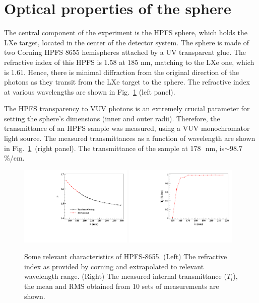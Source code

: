 \section{Optical properties of the sphere }
\label{sec:opt}


The central component of the experiment is the HPFS sphere, which holds the LXe target, located in the center of the detector system. The sphere is made of two Corning HPFS 8655 hemispheres attached by a UV transparent glue. The refractive index of this HPFS is 1.58 at 185 nm, matching to the LXe one, which is 1.61. Hence, there is minimal diffraction from the original direction of the photons as they transit from the LXe target to the sphere. The refractive index at various wavelengths are shown in Fig.~\ref{fig:hpfsRIcalibration} (left panel).


The HPFS transparency to VUV photons is an extremely crucial parameter for setting the sphere's dimensions (inner and outer radii). 
Therefore, the transmittance of an HPFS sample was measured, using a VUV monochromator light source. The measured transmittances as a function of wavelength are shown in Fig.~\ref{fig:hpfsRIcalibration}~(right panel). The transmittance of the sample at 178~\,nm, is$\sim98.7$\,\%/cm.  

\begin{figure}[h]
   \centering
   \includegraphics[width=0.48\textwidth]{RI-calibration.pdf}
    \includegraphics[width=0.48\textwidth]{IntTransmittance.pdf}
   \caption{Some relevant characteristics of HPFS-8655. (Left) The refractive index as provided by corning and 
   extrapolated to relevant wavelength range. (Right) The measured internal transmittance ($T_{i}$), the mean and RMS obtained from 10 sets of 
measurements are shown.}  
   \label{fig:hpfsRIcalibration}
\end{figure}


